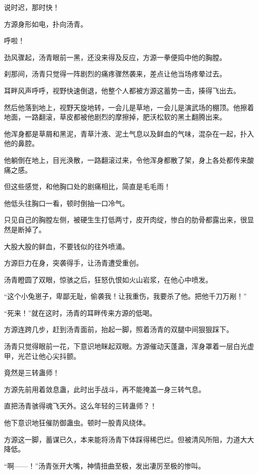 
\begin{this_body}

说时迟，那时快！

方源身形如电，扑向汤青。

呼啦！

劲风骤起，汤青眼前一黑，还没来得及反应，方源一拳便捣中他的胸膛。

刹那间，汤青只觉得一阵剧烈的痛疼骤然袭来，差点让他当场疼晕过去。

耳畔风声呼呼，视野快速倒退，他整个人都被方源这蓄势一击，揍得飞出去。

然后他落到地上，视野天旋地转，一会儿是草地，一会儿是演武场的棚顶。他擦着地面，一路翻滚，草皮都被他剧烈的摩擦掉，肥沃松软的黑土翻腾出来。

他浑身都是草屑和黑泥，青草汁液、泥土气息以及鲜血的气味，混杂在一起，扑入他的鼻腔。

他躺倒在地上，目光涣散，一路翻滚过来，令他浑身都散了架，身上各处都传来酸痛之感。

但这些感觉，和他胸口处的剧痛相比，简直是毛毛雨！

他低头往胸口一看，顿时倒抽一口冷气。

只见自己的胸膛左侧，被硬生生打低两寸，皮开肉绽，惨白的肋骨都露出来，很显然是断掉了。

大股大股的鲜血，不要钱似的往外喷涌。

方源巨力在身，突袭得手，让汤青遭受重创。

汤青瞪圆了双眼，惊骇之后，狂怒仇恨如火山岩浆，在他心中喷发。

“这个小兔崽子，卑鄙无耻，偷袭我！让我重伤，我要杀了他。把他千刀万剐！”

“死来！”就在这时，汤青的耳畔传来方源的低喝。

方源连跨几步，赶到汤青面前，抬起一脚，照着汤青的双腿中间狠狠踩下。

汤青只觉得眼前一花，下意识地眯起双眼。方源催动天蓬蛊，浑身罩着一层白光虚甲，光芒让他心尖抖颤。

竟然是三转蛊师！

方源先前用着敛息蛊，此时出手战斗，再不能掩盖一身三转气息。

直把汤青骇得魂飞天外。这么年轻的三转蛊师？！

他下意识地狂催防御蛊虫。顿时一股青风绕体。

方源这一脚，蓄谋已久，本来能将汤青下体踩得稀巴烂。但被清风所阻，力道大大降低。

“啊——！”汤青张开大嘴，神情扭曲至极，发出凄厉至极的惨叫。


\end{this_body}
